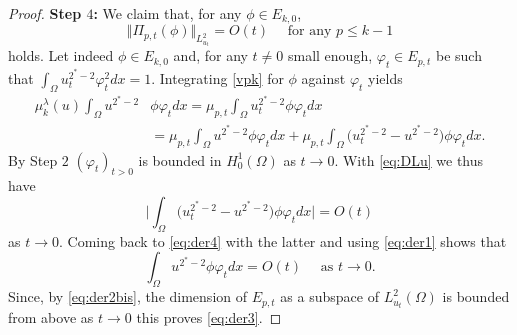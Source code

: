 \documentclass[10pt]{amsart}
\numberwithin{equation}{section}
\newcommand{\vp}{\varphi}
\newcommand{\Om}{\Omega}
\newcommand{\mkl}{\mu_{k}^{\lambda}}
\theoremstyle{plain}
\theoremstyle{remark}
\begin{document}
\begin{proof}
\medskip

\textbf{Step $4$:} We claim that, for any $\phi \in E_{k,0}$,
\begin{equation} \label{eq:der3}
\Vert \Pi_{p,t}(\phi) \Vert_{L^2_{u_t}} = O(t) \quad \text{ for any } p \le k-1
\end{equation}
holds. Let indeed $\phi \in E_{k,0}$ and, for any $t \neq 0$ small enough, $\vp_t \in E_{p,t}$ be such that $\int_\Om u_t^{2^*-2} \vp_t^2dx = 1$. Integrating \eqref{vpk} for $\phi$ against $\vp_t$ yields
\begin{equation} \label{eq:der4}
\begin{aligned}
 \mkl(u) \int_{\Om} u^{2^*-2}& \phi \vp_t dx  = \mu_{p,t} \int_{\Om} u_t^{2^*-2}\phi  \vp_t  dx \\
 & =  \mu_{p,t}  \int_{\Om} u^{2^*-2} \phi \vp_t dx + \mu_{p,t} \int_{\Om} \big( u_t^{2^*-2} - u^{2^*-2}\big)\phi  \vp_t  dx.
\end{aligned}
\end{equation}
By Step $2$ $(\vp_t)_{t>0}$ is bounded in $H^1_0(\Om)$ as $t \to 0$. With \eqref{eq:DLu} we thus have 
$$ \Big| \int_{\Om} \big( u_t^{2^*-2} - u^{2^*-2}\big)\phi  \vp_t  dx \Big| = O(t) $$
as $ t \to 0$. Coming back to \eqref{eq:der4} with the latter and using \eqref{eq:der1} shows that
$$\int_{\Om} u^{2^*-2} \phi \vp_t dx = O(t) \quad \text{ as } t \to 0.$$
Since, by \eqref{eq:der2bis}, the dimension of $E_{p,t}$ as a subspace of $L^2_{u_t}(\Om)$ is bounded from above as $t \to 0$ this proves \eqref{eq:der3}.
 
 \medskip
 

\end{proof}
\end{document}
